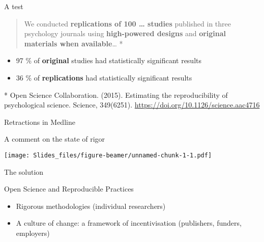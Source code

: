 \documentclass[
  ignorenonframetext,
]{beamer}
\providecommand{\tightlist}{%
  \setlength{\itemsep}{0pt}\setlength{\parskip}{0pt}}
\begin{document}
\begin{frame}{A test}
\protect\hypertarget{a-test}{}

\begin{quote}
We conducted \textbf{replications of 100 \ldots{} studies} published in
three psychology journals using \textbf{high-powered designs} and
\textbf{original materials when available}\ldots{} *
\end{quote}

\begin{itemize}[<+->]
\tightlist
\item
  {97 \%} of \textbf{original} studies had {statistically significant
  results}
\item
  {36 \%} of \textbf{replications} had {statistically significant
  results}
\end{itemize}

{* Open Science Collaboration. (2015). Estimating the reproducibility of
psychological science. Science, 349(6251).
\url{https://doi.org/10.1126/science.aac4716}}

\end{frame}

\begin{frame}{Retractions in Medline}
\protect\hypertarget{retractions-in-medline}{}

\begin{block}{A comment on the state of rigor}

\texttt{[image: Slides\_files/figure-beamer/unnamed-chunk-1-1.pdf]}

\end{block}

\end{frame}

\begin{frame}{The solution}
\protect\hypertarget{the-solution}{}

\begin{block}{Open Science and Reproducible Practices}

\begin{itemize}
\tightlist
\item
  Rigorous methodologies (individual researchers)
\item
  A culture of change: a framework of incentivisation (publishers,
  funders, employers)
\end{itemize}

\end{block}

\end{frame}
\end{document}
